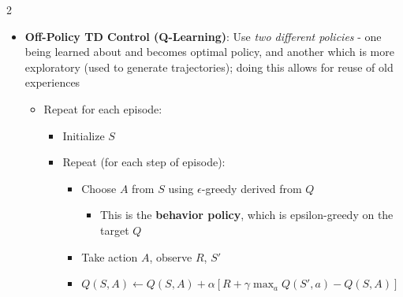 \documentclass{article}
\providecommand{\tightlist}{%
  \setlength{\itemsep}{\GlobalItemSep}\setlength{\parskip}{\GlobalListParSkip}}
\newlength{\GlobalItemSep}
\newlength{\GlobalListParSkip}
\begin{document}
\begin{multicols}{2}
\begin{itemize}
\begin{itemize}
\begin{itemize}
\begin{itemize}
\begin{itemize}
          \begin{itemize}
          \tightlist
          \item
            This can be generalized to n-step as well:
            \(q_t^{(n)}= R_{t+1} + \gamma R_{t+2} + ... + \gamma^{n-1}R_{t+n} + \gamma^n Q(S_{t+n}, A_{t+n})\)
          \end{itemize}
        \item
          \(S \leftarrow S'; A \leftarrow A'\)
        \end{itemize}
      \end{itemize}
    \end{itemize}
  \item
    \textbf{Off-Policy TD Control (Q-Learning)}: Use \emph{two different
    policies} - one being learned about and becomes optimal policy, and
    another which is more exploratory (used to generate trajectories);
    doing this allows for reuse of old experiences

    \begin{itemize}
    \tightlist
    \item
      Repeat for each episode:

      \begin{itemize}
      \tightlist
      \item
        Initialize \(S\)
      \item
        Repeat (for each step of episode):

        \begin{itemize}
        \tightlist
        \item
          Choose \(A\) from \(S\) using \(\epsilon\)-greedy derived from
          \(Q\)

          \begin{itemize}
          \tightlist
          \item
            This is the \textbf{behavior policy}, which is
            epsilon-greedy on the target \(Q\)
          \end{itemize}
        \item
          Take action \(A\), observe \(R\), \(S'\)
        \item
          \(Q(S, A) \leftarrow Q(S,A) + \alpha[R + \gamma \max_a Q(S', a) - Q(S, A)]\)


\end{itemize}
\end{itemize}
\end{itemize}
\end{itemize}
\end{itemize}
\end{multicols}
\end{document}

